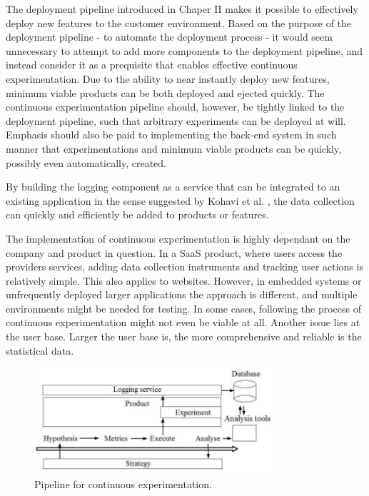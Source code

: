 \documentclass[conference]{IEEEtran}
\begin{document}
The deployment pipeline introduced in Chaper II makes it possible to effectively deploy new features to the customer environment. Based on the purpose of the deployment pipeline - to automate the deployment process - it would seem unnecessary to attempt to add more components to the deployment pipeline, and instead consider it as a prequisite that enables effective continuous experimentation. Due to the ability to near instantly deploy new features, minimum viable products can be both deployed and ejected quickly. The continuous experimentation pipeline should, however, be tightly linked to the deployment pipeline, such that arbitrary experiments can be deployed at will. Emphasis should also be paid to implementing the back-end system in such manner that experimentations and minimum viable products can be quickly, possibly even automatically, created. 

By building the logging component as a service that can be integrated to an existing application in the sense suggested by Kohavi et al. \cite{kohavi2007practical}, the data collection can quickly and efficiently be added to products or features. 

The implementation of continuous experimentation is highly dependant on the company and product in question. In a SaaS product, where users access the providers services, adding data collection instruments and tracking user actions is relatively simple. This also applies to websites. However, in embedded systems or unfrequently deployed larger applications the approach is different, and multiple environments might be needed for testing. In some cases, following the process of continuous experimentation might not even be viable at all. Another issue lies at the user base. Larger the user base is, the more comprehensive and reliable is the statistical data. 

\begin{figure}[H]
	\centering
	\includegraphics[width=3.5in]{cepl.jpg}
	\caption{Pipeline for continuous experimentation.}
	\label{fig5}
\end{figure}
\end{document}
